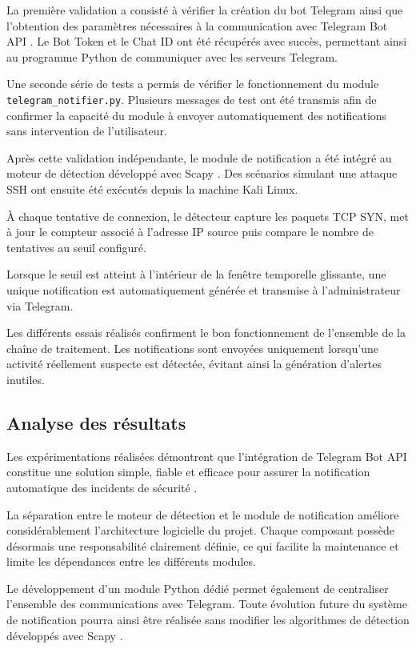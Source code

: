 La première validation a consisté à vérifier la création du bot Telegram ainsi que l'obtention des paramètres nécessaires à la communication avec Telegram Bot API \cite{telegram_bot_api}. Le Bot Token et le Chat ID ont été récupérés avec succès, permettant ainsi au programme Python de communiquer avec les serveurs Telegram.

Une seconde série de tests a permis de vérifier le fonctionnement du module \texttt{telegram\_notifier.py}. Plusieurs messages de test ont été transmis afin de confirmer la capacité du module à envoyer automatiquement des notifications sans intervention de l'utilisateur.

Après cette validation indépendante, le module de notification a été intégré au moteur de détection développé avec Scapy \cite{scapy_docs}. Des scénarios simulant une attaque SSH ont ensuite été exécutés depuis la machine Kali Linux.

À chaque tentative de connexion, le détecteur capture les paquets TCP SYN, met à jour le compteur associé à l'adresse IP source puis compare le nombre de tentatives au seuil configuré.

Lorsque le seuil est atteint à l'intérieur de la fenêtre temporelle glissante, une unique notification est automatiquement générée et transmise à l'administrateur via Telegram.

Les différents essais réalisés confirment le bon fonctionnement de l'ensemble de la chaîne de traitement. Les notifications sont envoyées uniquement lorsqu'une activité réellement suspecte est détectée, évitant ainsi la génération d'alertes inutiles.

\subsection{Analyse des résultats}

Les expérimentations réalisées démontrent que l'intégration de Telegram Bot API constitue une solution simple, fiable et efficace pour assurer la notification automatique des incidents de sécurité \cite{telegram_bot_api}.

La séparation entre le moteur de détection et le module de notification améliore considérablement l'architecture logicielle du projet. Chaque composant possède désormais une responsabilité clairement définie, ce qui facilite la maintenance et limite les dépendances entre les différents modules.

Le développement d'un module Python dédié permet également de centraliser l'ensemble des communications avec Telegram. Toute évolution future du système de notification pourra ainsi être réalisée sans modifier les algorithmes de détection développés avec Scapy \cite{scapy_docs}.

